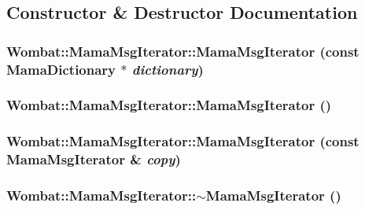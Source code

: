 \subsection{Constructor \& Destructor Documentation}
\hypertarget{classWombat_1_1MamaMsgIterator_ae5e16e84272e265e65daf1d270a73c79}{
\subsubsection[{MamaMsgIterator}]{\setlength{\rightskip}{0pt plus 5cm}Wombat::MamaMsgIterator::MamaMsgIterator (const {\bf MamaDictionary} $\ast$ {\em dictionary})}}
\label{classWombat_1_1MamaMsgIterator_ae5e16e84272e265e65daf1d270a73c79}
\hypertarget{classWombat_1_1MamaMsgIterator_a4eef96946f71db9f68a0cbd31602caea}{
\subsubsection[{MamaMsgIterator}]{\setlength{\rightskip}{0pt plus 5cm}Wombat::MamaMsgIterator::MamaMsgIterator ()}}
\label{classWombat_1_1MamaMsgIterator_a4eef96946f71db9f68a0cbd31602caea}
\hypertarget{classWombat_1_1MamaMsgIterator_a80cf6eb3124d536a134937dff45f41a9}{
\subsubsection[{MamaMsgIterator}]{\setlength{\rightskip}{0pt plus 5cm}Wombat::MamaMsgIterator::MamaMsgIterator (const {\bf MamaMsgIterator} \& {\em copy})}}
\label{classWombat_1_1MamaMsgIterator_a80cf6eb3124d536a134937dff45f41a9}
\hypertarget{classWombat_1_1MamaMsgIterator_ad5e8b4fd37731e3b84aac89ca850c6be}{
\subsubsection[{$\sim$MamaMsgIterator}]{\setlength{\rightskip}{0pt plus 5cm}Wombat::MamaMsgIterator::$\sim$MamaMsgIterator ()}}
\label{classWombat_1_1MamaMsgIterator_ad5e8b4fd37731e3b84aac89ca850c6be}


